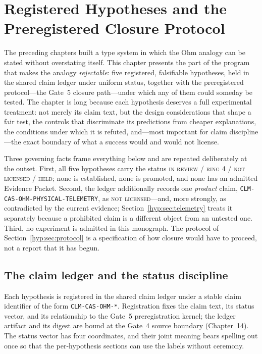\chapter{Registered Hypotheses and the Preregistered Closure Protocol}\label{hyp:chapter}

The preceding chapters built a type system in which the Ohm analogy can be stated without overstating itself. This chapter presents the part of the program that makes the analogy \emph{rejectable}: five registered, falsifiable hypotheses, held in the shared claim ledger under uniform status, together with the preregistered protocol---the Gate~5 closure path---under which any of them could someday be tested. The chapter is long because each hypothesis deserves a full experimental treatment: not merely its claim text, but the design considerations that shape a fair test, the controls that discriminate its predictions from cheaper explanations, the conditions under which it is refuted, and---most important for claim discipline---the exact boundary of what a success would and would not license.

Three governing facts frame everything below and are repeated deliberately at the outset. First, all five hypotheses carry the status \textsc{in review / ring 4 / not licensed / held}; none is established, none is promoted, and none has an admitted Evidence Packet. Second, the ledger additionally records one \emph{product} claim, \texttt{CLM-CAS-OHM-PHYSICAL-TELEMETRY}, as \textsc{not licensed}---and, more strongly, as contradicted by the current evidence; Section~\ref{hyp:sec:telemetry} treats it separately because a prohibited claim is a different object from an untested one. Third, no experiment is admitted in this monograph. The protocol of Section~\ref{hyp:sec:protocol} is a specification of how closure would have to proceed, not a report that it has begun.

\section{The claim ledger and the status discipline}\label{hyp:sec:ledger}

Each hypothesis is registered in the shared claim ledger under a stable claim identifier of the form \texttt{CLM-CAS-OHM-*}. Registration fixes the claim text, its status vector, and its relationship to the Gate~5 preregistration kernel; the ledger artifact and its digest are bound at the Gate~4 source boundary (Chapter~14). The status vector has four coordinates, and their joint meaning bears spelling out once so that the per-hypothesis sections can use the labels without ceremony.

